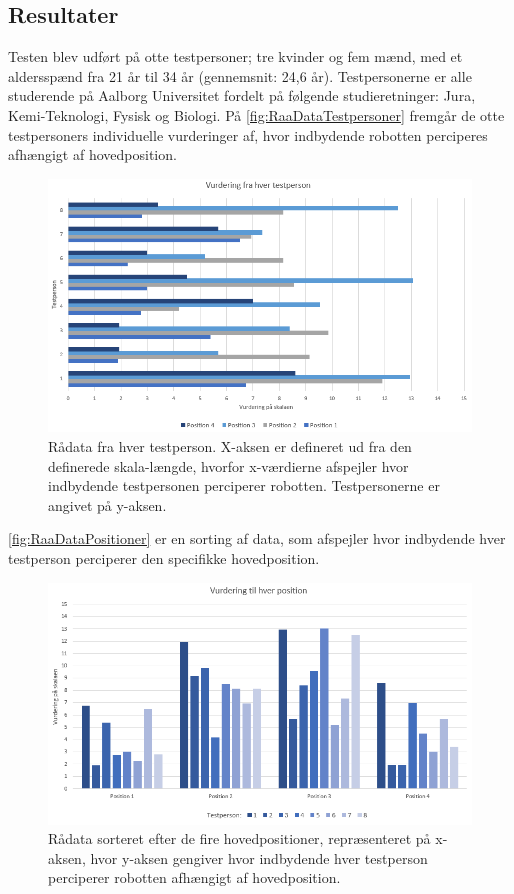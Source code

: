 \subsection*{Resultater}
\label{Resultater}
%
Testen blev udført på otte testpersoner; tre kvinder og fem mænd, med et aldersspænd fra 21 år til 34 år (gennemsnit: 24,6 år). Testpersonerne er alle studerende på Aalborg Universitet fordelt på følgende studieretninger: Jura, Kemi-Teknologi, Fysisk og Biologi.\blankline
%
På \autoref{fig:RaaDataTestpersoner} fremgår de otte testpersoners individuelle vurderinger af, hvor indbydende robotten perciperes afhængigt af hovedposition.  
%
\begin{figure}[H]
\centering
\includegraphics[width = \textwidth]{Figure/RaaDataTestpersoner.PNG} 
\caption{Rådata fra hver testperson. X-aksen er defineret ud fra den definerede skala-længde, hvorfor x-værdierne afspejler hvor indbydende testpersonen perciperer robotten. Testpersonerne er angivet på y-aksen.}
\label{fig:RaaDataTestpersoner}
\end{figure}
\noindent
%
\autoref{fig:RaaDataPositioner} er en sorting af data, som afspejler hvor indbydende hver testperson perciperer den specifikke hovedposition. 
%
\begin{figure}[H]
\centering
\includegraphics[width = \textwidth]{Figure/RaaDataPositioner.PNG} 
\caption{Rådata sorteret efter de fire hovedpositioner, repræsenteret på x-aksen, hvor y-aksen gengiver hvor indbydende hver testperson perciperer robotten afhængigt af hovedposition.}
\label{fig:RaaDataPositioner}
\end{figure}

